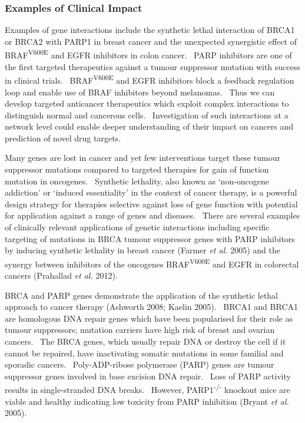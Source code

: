 \subsubsection[Examples of Clinical Impact]{Examples of Clinical Impact}

Examples of gene interactions include the synthetic lethal interaction of BRCA1 or BRCA2 with PARP1 in breast cancer and the unexpected synergistic effect of BRAF\textsuperscript{V600E} and EGFR inhibitors in colon cancer. \ PARP inhibitors are one of the first targeted therapeutics against a tumour suppressor mutation with success in clinical trials. \ BRAF\textsuperscript{V600E} and EGFR inhibitors block a feedback regulation loop and enable use of BRAF inhibitors beyond melanomas. \ Thus we can develop targeted anticancer therapeutics which exploit complex interactions to distinguish normal and cancerous cells. \ Investigation of such interactions at a network level could enable deeper understanding of their impact on cancers and prediction of novel drug targets. 

Many genes are lost in cancer and yet few interventions target these tumour suppressor mutations compared to targeted therapies for gain of function mutation in oncogenes. \ Synthetic lethality, also known as {\textquoteleft}non-oncogene addiction{\textquoteright} or {\textquoteleft}induced essentiality{\textquoteright} in the context of cancer therapy, is a powerful design strategy for therapies selective against loss of gene function with potential for application against a range of genes and diseases. \ There are several examples of clinically relevant applications of genetic interactions including specific targeting of mutations in BRCA tumour suppressor genes with PARP inhibitors by inducing synthetic lethality in breast cancer (Farmer\textit{ et al.} 2005) and the synergy between inhibitors of the oncogenes BRAF\textsuperscript{V600E} and EGFR in colorectal cancers (Prahallad\textit{ et al.} 2012). 

BRCA and PARP genes demonstrate the application of the synthetic lethal approach to cancer therapy (Ashworth 2008; Kaelin 2005). \ BRCA1 and BRCA1 are homologous DNA repair genes which have been popularised for their role as tumour suppressors; mutation carriers have high risk of breast and ovarian cancers. \ The BRCA genes, which usually repair DNA or destroy the cell if it cannot be repaired, have inactivating somatic mutations in some familial and sporadic cancers. \ Poly-ADP-ribose polymerase (PARP) genes are tumour suppressor genes involved in base excision DNA repair. \ Loss of PARP activity results in single-stranded DNA breaks. \ However, PARP1\textsuperscript{{}-/-}\textsubscript{ }knockout mice are viable and healthy indicating low toxicity from PARP inhibition (Bryant\textit{ et al.} 2005). \  

